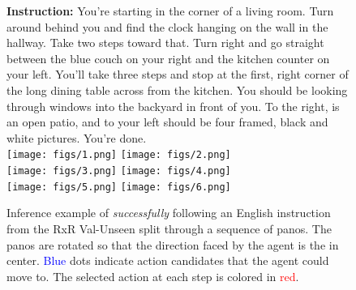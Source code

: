 \begin{figure*}[h]
  \centering
  \textbf{Instruction:} You're starting in the corner of a living room. Turn around behind you and find the clock hanging on the wall in the hallway. Take two steps toward that. Turn right and go straight between the blue couch on your right and the kitchen counter on your left. You'll take three steps and stop at the first, right corner of the long dining table across from the kitchen. You should be looking through windows into the backyard in front of you. To the right, is an open patio, and to your left should be four framed, black and white pictures. You're done.
  \vspace{1mm}\\
  \texttt{[image: figs/1.png]}
  \texttt{[image: figs/2.png]} \vspace{2mm}\\
  \texttt{[image: figs/3.png]}
  \texttt{[image: figs/4.png]} \vspace{2mm}\\
  \texttt{[image: figs/5.png]}
  \texttt{[image: figs/6.png]}
  \caption{Inference example of \ModelName{} \textit{successfully} following an English instruction from the RxR Val-Unseen split through a sequence of panos.  The panos are rotated so that the direction faced by the agent is the in center. \textcolor{blue}{Blue} dots indicate action candidates that the agent could move to. The selected action at each step is colored in \textcolor{red}{red}. }
  \label{fig:example2}
\end{figure*}


